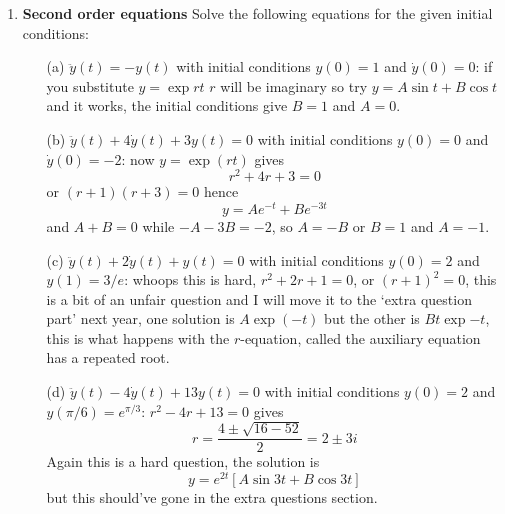 \documentclass[11pt,a4paper]{scrartcl}
\begin{document}
\begin{enumerate}
\item \textbf{Second order equations} Solve the following equations for the given initial conditions:
	\begin{itemize}
		\item[(a)] $\ddot{y}(t) = -y(t)$ with initial conditions $y(0) = 1$ and $\dot{y}(0) = 0$: if you substitute $y=\exp{rt}$ $r$ will be imaginary so try $y=A\sin{t}+B\cos{t}$ and it works, the initial conditions give $B=1$ and $A=0$. 
		\item[(b)] $\ddot{y}(t) + 4\dot{y}(t) + 3y(t) = 0$ with initial conditions $y(0) = 0$ and $\dot{y}(0) = -2$: now $y=\exp{(rt)}$ gives
                  $$r^2+4r+3=0$$
                  or $(r+1)(r+3)=0$ hence
                  $$y=Ae^{-t}+Be^{-3t}$$
                  and $A+B=0$ while $-A-3B=-2$, so $A=-B$ or $B=1$ and $A=-1$.
                \item[(c)] $\ddot{y}(t) + 2\dot{y}(t) + y(t) = 0$ with initial conditions $y(0) = 2$ and $y(1) = 3/e$: whoops this is hard, $r^2+2r+1=0$, or $(r+1)^2=0$, this is a bit of an unfair question and I will move it to the `extra question part' next year, one solution is $A\exp{(-t)}$ but the other is $Bt\exp{-t}$, this is what happens with the $r$-equation, called the auxiliary equation has a repeated root.
		\item[(d)] $\ddot{y}(t) - 4\dot{y}(t) + 13y(t) = 0$ with initial conditions $y(0) = 2$ and $y(\pi/6) = e^{\pi/3}$: $r^2-4r+13=0$ gives
                  $$
                  r=\frac{4\pm\sqrt{16-52}}{2}=2\pm 3i
                  $$
                  Again this is a hard question, the solution is
                  $$
                  y=e^{2t}[A\sin{3t}+B\cos{3t}]$$
                    but this should've gone in the extra questions section.
	\end{itemize}
	

\end{enumerate}
\end{document}
